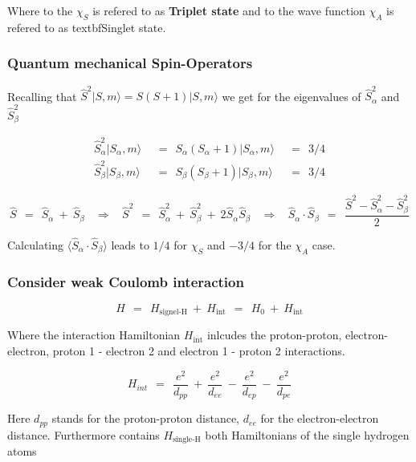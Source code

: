 \documentclass[10pt]{report}
\numberwithin{equation}{chapter}
\begin{document}
Where to the $\chi_S$ is refered to as \textbf{Triplet state} and to the wave function $\chi_A$ is refered to as textbf{Singlet state}.


\subsubsection{Quantum mechanical Spin-Operators}

Recalling that $\hat{S}^2 |S,m \rangle = S(S+1) | S,m \rangle$ we get for the eigenvalues of $\hat{S}^2_\alpha$ and $\hat{S}^2_\beta$

\begin{align}
  \hat{S}^2_\alpha |S_\alpha,m\rangle ~~ & = ~~ S_\alpha (S_\alpha+1) |S_\alpha,m\rangle ~~ & = ~~ 3/4\\
  \hat{S}^2_\beta  |S_\beta,m\rangle ~~ & = ~~ S_\beta  (S_\beta+1)  |S_\beta,m\rangle ~~ & = ~~ 3/4
\end{align}


\begin{equation}
  \hat{S} ~~=~~ \hat{S}_\alpha ~+~ \hat{S}_\beta ~~~~ \Rightarrow ~~~~ 
  \hat{S}^2 ~~=~~ \hat{S}^2_\alpha ~+~ \hat{S}^2_\beta ~+~ 2 \hat{S}_\alpha \hat{S}_\beta ~~~~ \Rightarrow ~~~~
  \hat{S}_\alpha \cdot \hat{S}_\beta ~~=~~ \frac{\hat{S}^2 - \hat{S}^2_\alpha - \hat{S}^2_\beta}{2}
\end{equation}


Calculating $\langle \hat{S}_\alpha \cdot \hat{S}_\beta \rangle$ leads to $1/4$ for $\chi_S$ and $-3/4$ for the $\chi_A$ case.


\subsubsection{Consider weak Coulomb interaction}


\begin{equation}
  H ~~=~~ H_\text{signel-H} ~+~ H_\text{int} ~~=~~ H_0 ~+~ H_\text{int}
\end{equation}

Where the interaction Hamiltonian $H_\text{int}$ inlcudes the proton-proton, electron-electron, proton 1 - electron 2 and electron 1 - proton 2 interactions.

\begin{equation}
  H_{int} ~~=~~ \frac{e^2}{d_{pp}} ~+~ \frac{e^2}{d_{ee}} ~-~ \frac{e^2}{d_{ep}} ~-~ \frac{e^2}{d_{pe}}
\end{equation}

Here $d_{pp}$ stands for the proton-proton distance, $d_{ee}$ for the electron-electron distance.
Furthermore contains $H_\text{single-H}$ both Hamiltonians of the single hydrogen atoms
\end{document}
